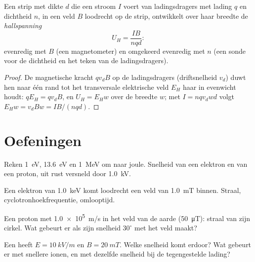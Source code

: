 \begin{proposition}[Halleffect]\label{prop:b1:charged-particles:hall}
Een strip met dikte $d$ die een stroom $I$ voert van ladingsdragers met lading
$q$ en dichtheid $n$, in een veld $B$ loodrecht op de strip,
ontwikkelt over haar breedte de \emph{hallspanning}
\[
U_H = \frac{IB}{nqd} :
\]
evenredig met $B$ (een magnetometer) en omgekeerd evenredig met $n$ (een sonde voor
de dichtheid en het teken van de ladingsdragers).
\end{proposition}

\begin{proof}
De magnetische kracht $qv_dB$ op de ladingsdragers (driftsnelheid $v_d$) duwt
hen naar één rand tot het transversale elektrische veld $E_H$ haar in evenwicht houdt:
$qE_H = qv_dB$, en $U_H = E_Hw$ over de breedte $w$; met $I = nqv_dwd$ volgt
$E_Hw = v_dBw = IB/(nqd)$.
\end{proof}

\section{Oefeningen}

\begin{exercise}[$\star$]\label{exo:b1:charged-particles:1}
Reken \qty{1}{eV}, \qty{13.6}{eV} en \qty{1}{MeV} om naar joule. Snelheid van een
elektron en van een proton, uit rust versneld door \qty{1.0}{kV}.
\end{exercise}

\begin{exercise}[$\star$]\label{exo:b1:charged-particles:2}
Een elektron van \qty{1.0}{keV} komt loodrecht een veld van \qty{1.0}{mT} binnen.
Straal, cyclotronhoekfrequentie, omlooptijd.
\end{exercise}

\begin{exercise}[$\star$]\label{exo:b1:charged-particles:3}
Een proton met \qty{1.0e5}{m/s} in het veld van de aarde (\qty{50}{\micro T}):
straal van zijn cirkel. Wat gebeurt er als zijn snelheid $30^\circ$ met
het veld maakt?
\end{exercise}

\begin{exercise}[$\star$]\label{exo:b1:charged-particles:4}
Een  heeft $E = \qty{10}{kV/m}$ en $B = \qty{20}{mT}$. Welke
snelheid komt erdoor? Wat gebeurt er met snellere ionen, en met dezelfde snelheid bij
de tegengestelde lading?
\end{exercise}

